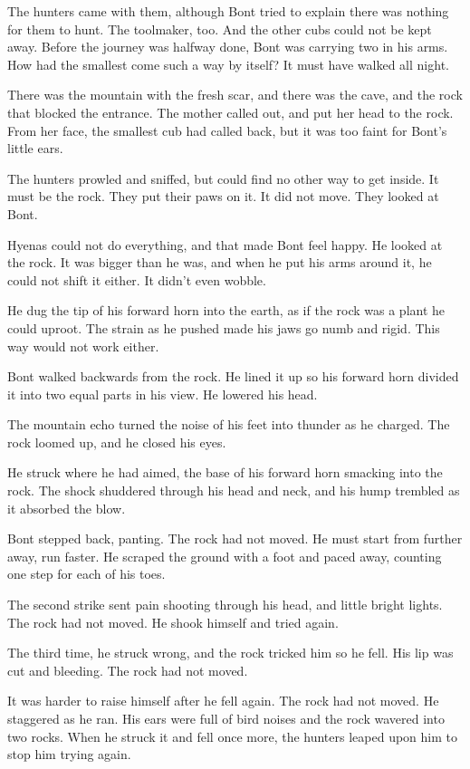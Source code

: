 \secdiv

\noindent The hunters came with them, although Bont tried to explain there was nothing for them to hunt. The toolmaker, too. And the other cubs could not be kept away. Before the journey was halfway done, Bont was carrying two in his arms. How had the smallest come such a way by itself? It must have walked all night.

There was the mountain with the fresh scar, and there was the cave, and the rock that blocked the entrance. The mother called out, and put her head to the rock. From her face, the smallest cub had called back, but it was too faint for Bont's little ears.

The hunters prowled and sniffed, but could find no other way to get inside. It must be the rock. They put their paws on it. It did not move. They looked at Bont.

Hyenas could not do everything, and that made Bont feel happy. He looked at the rock. It was bigger than he was, and when he put his arms around it, he could not shift it either. It didn't even wobble.

He dug the tip of his forward horn into the earth, as if the rock was a plant he could uproot. The strain as he pushed made his jaws go numb and rigid. This way would not work either.

Bont walked backwards from the rock. He lined it up so his forward horn divided it into two equal parts in his view. He lowered his head.

The mountain echo turned the noise of his feet into thunder as he charged. The rock loomed up, and he closed his eyes.

He struck where he had aimed, the base of his forward horn smacking into the rock. The shock shuddered through his head and neck, and his hump trembled as it absorbed the blow.

Bont stepped back, panting. The rock had not moved. He must start from further away, run faster. He scraped the ground with a foot and paced away, counting one step for each of his toes.

The second strike sent pain shooting through his head, and little bright lights. The rock had not moved. He shook himself and tried again.

The third time, he struck wrong, and the rock tricked him so he fell. His lip was cut and bleeding. The rock had not moved.

It was harder to raise himself after he fell again. The rock had not moved. He staggered as he ran. His ears were full of bird noises and the rock wavered into two rocks. When he struck it and fell once more, the hunters leaped upon him to stop him trying again.

